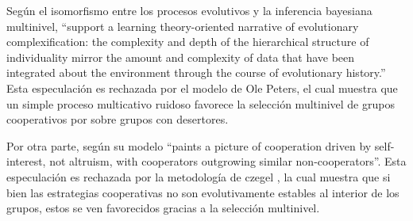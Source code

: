 \documentclass[a4paper,10pt]{article}
\begin{document}
Según \cite{czegel2019-bayesianEvolution} el isomorfismo entre los procesos evolutivos y la inferencia bayesiana multinivel,  ``support a learning theory-oriented narrative of evolutionary complexification: the complexity and depth of the hierarchical structure of individuality mirror the amount and complexity of data that have been integrated about the environment through the course of evolutionary history.''
Esta especulación es rechazada por el modelo de Ole Peters, el cual muestra que un simple proceso multicativo ruidoso favorece la selección multinivel de grupos cooperativos por sobre grupos con desertores.

Por otra parte, según \cite{peters} su modelo ``paints a picture of cooperation driven by self-interest, not altruism, with cooperators outgrowing similar non-cooperators''.
Esta especulación es rechazada por la metodología de czegel \cite{czegel2019-bayesianEvolution}, la cual muestra que si bien las estrategias cooperativas no son evolutivamente estables al interior de los grupos, estos se ven favorecidos gracias a la selección multinivel.


% 
{\footnotesize


}
\end{document}
